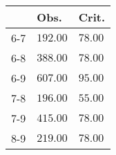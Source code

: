 \begin{table}[ht]
\centering
\begin{tabular}{rll}
  \hline
 & Obs. & Crit. \\ 
  \hline
6-7 & \(\mathbf{192.00}\) & \(\mathbf{78.00}\) \\ 
  6-8 & \(\mathbf{388.00}\) & \(\mathbf{78.00}\) \\ 
  6-9 & \(\mathbf{607.00}\) & \(\mathbf{95.00}\) \\ 
  7-8 & \(\mathbf{196.00}\) & \(\mathbf{55.00}\) \\ 
  7-9 & \(\mathbf{415.00}\) & \(\mathbf{78.00}\) \\ 
  8-9 & \(\mathbf{219.00}\) & \(\mathbf{78.00}\) \\ 
   \hline
\end{tabular}
\end{table}
